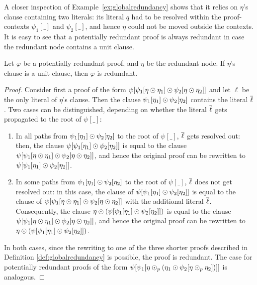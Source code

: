 \documentclass[envcountsame]{llncs}
\begin{document}
A closer inspection of Example~\ref{ex:globalredundancy}
shows that it relies on $\eta$'s clause containing two literals: its literal $q$ had to be resolved within the proof-contexts $\psi_1[\_]$ and $\psi_2[\_]$, and hence $\eta$ could not be moved outside the contexts. It is easy to see that a potentially redundant proof is always
redundant in case the redundant node contains a unit clause.

\begin{theorem}
\label{Theorem:UnitApparentRedundanciesAlwaysRedundancies}
Let $\varphi$ be a potentially redundant proof, and $\eta$ be the
redundant node. If $\eta$'s clause is a unit clause, then $\varphi$ is
redundant.
\end{theorem}
\begin{proof}
Consider first a proof of the form $\psi[\psi_1[\eta \odot \eta_1] \odot \psi_2[\eta \odot \eta_2]]$ 
and let $\ell$ be the only literal of $\eta$'s clause.
Then the clause $\psi_1[\eta_1] \odot \psi_2[\eta_2]$ contains the literal
$\overline{\ell}$. Two cases can be distinguished, depending on whether the literal $\overline{\ell}$ gets propagated to the root of $\psi[\_]$:
\begin{enumerate}
\item In all paths from $\psi_1[\eta_1] \odot \psi_2[\eta_2]$ to the root of $\psi[\_]$, $\overline{\ell}$ gets resolved out: then, the clause $\psi[\psi_1[\eta_1] \odot \psi_2[\eta_2]]$ is equal to the clause $\psi[\psi_1[\eta \odot \eta_1] \odot \psi_2[\eta \odot \eta_2]]$, and hence the original proof can be rewritten to $\psi[\psi_1[\eta_1] \odot \psi_2[\eta_2]]$.
%
\item In some paths from $\psi_1[\eta_1] \odot \psi_2[\eta_2]$ to the root of $\psi[\_]$, $\overline{\ell}$ does not get resolved out: in this case, the clause of $\psi[\psi_1[\eta_1] \odot \psi_2[\eta_2]]$ is equal to the clause of $\psi[\psi_1[\eta \odot \eta_1] \odot \psi_2[\eta \odot \eta_2]]$ with the additional literal $\overline{\ell}$. Consequently, the clause $\eta \odot (\psi[\psi_1[\eta_1] \odot \psi_2[\eta_2]])$ is equal to the clause $\psi[\psi_1[\eta \odot \eta_1] \odot \psi_2[\eta \odot \eta_2]]$, and hence the original proof can be rewritten to $\eta \odot (\psi[\psi_1[\eta_1] \odot \psi_2[\eta_2]])$.
\end{enumerate}
In both cases, since the rewriting to one of the three shorter proofs described in Definition \ref{def:globalredundancy} is possible, the proof is redundant.
The case for potentially redundant proofs of the form $\psi[ \psi_1[\eta \odot_p (\eta_1 \odot \psi_2[\eta \odot_p \eta_2])]]$ is analogous.
%
\hfill\QED
\end{proof}
\end{document}
